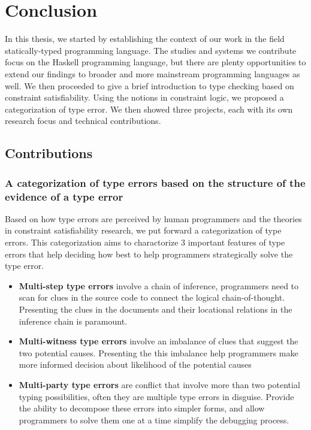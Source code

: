 

\chapter{Conclusion}

\label{chap:conclusion} 
\newcommand{\toolname}{TypeTutor}



\graphicspath{{Figures/Conclusion}}

In this thesis, we started by establishing the context of our work in the field statically-typed programming language. The studies and systems we contribute focus on the Haskell programming language, but there are plenty opportunities to extend our findings to broader and more mainstream programming languages as well. We then proceeded to give a brief introduction to type checking based on constraint satisfiability. Using the notions in constraint logic, we proposed a categorization of type error. We then showed three projects, each with its own research focus and technical contributions.


\section{Contributions}


\subsection{A categorization of type errors based on the structure of the evidence of a type error}

Based on how type errors are perceived by human programmers and the theories in constraint satisfiability research, we put forward a categorization of type errors. This categorization aims to charactorize 3 important features of type errors that help deciding how best to help programmers strategically solve the type error. 
\begin{itemize}
    \item {\textbf{Multi-step type errors} involve a chain of inference, programmers need to scan for clues in the source code to connect the logical chain-of-thought. Presenting the clues in the documents and their locational relations in the inference chain is paramount.}
    \item{\textbf{Multi-witness type errors} involve an imbalance of clues that suggest the two potential causes. Presenting the this imbalance help programmers make more informed decision about likelihood of the potential causes}
    \item{\textbf{Multi-party type errors} are conflict that involve more than two potential typing possibilities, often they are multiple type errors in disguise. Provide the ability to decompose these errors into simpler forms, and allow programmers to solve them one at a time simplify the debugging process. }
\end{itemize}


